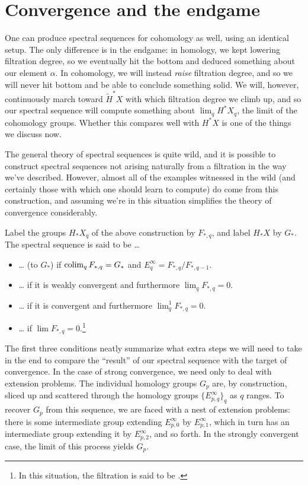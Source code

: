 \section{Convergence and the endgame}

One can produce spectral sequences for cohomology as well, using an identical setup.  The only difference is in the endgame: in homology, we kept lowering filtration degree, so we eventually hit the bottom and deduced something about our element $\alpha$.  In cohomology, we will instead \emph{raise} filtration degree, and so we will never hit bottom and be able to conclude something solid.  We will, however, continuously march toward $\tilde H^* X$ with which filtration degree we climb up, and so our spectral sequence will compute something about $\lim_q H^* X_q$, the limit of the cohomology groups.  Whether this compares well with $H^* X$ is one of the things we discuss now.

The general theory of spectral sequences is quite wild, and it is possible to construct spectral sequences not arising naturally from a filtration in the way we've described.  However, almost all of the examples witnessed in the wild (and certainly those with which one should learn to compute) do come from this construction, and assuming we're in this situation simplifies the theory of convergence considerably.

Label the groups $H_* X_q$ of the above construction by $F_{*, q}$, and label $H_* X$ by $G_*$.  The spectral sequence is said to be \ldots
\begin{itemize}
\item \ldots {} (to $G_*$) if $\operatorname{colim}_q F_{*, q} = G_*$ and $E^\infty_q = F_{*, q} / F_{*, q-1}$.
\item \ldots {} if it is weakly convergent and furthermore $\lim_q F_{*, q} = 0$.
\item \ldots {} if it is convergent and furthermore $\lim^1_q F_{*, q} = 0$.
\item \ldots {} if $\lim F_{*, q} = 0$.\footnote{In this situation, the filtration is said to be .}
\end{itemize}

The first three conditions neatly summarize what extra steps we will need to take in the end to compare the ``result'' of our spectral sequence with the target of convergence.  In the case of strong convergence, we need only to deal with extension problems.  The individual homology groups $G_p$ are, by construction, sliced up and scattered through the homology groups $\{E^\infty_{p, q}\}_q$ as $q$ ranges.  To recover $G_p$ from this sequence, we are faced with a nest of extension problems: there is some intermediate group extending $E^\infty_{p, 0}$ by $E^\infty_{p, 1}$, which in turn has an intermediate group extending it by $E^\infty_{p, 2}$, and so forth.  In the strongly convergent case, the limit of this process yields $G_p$.


